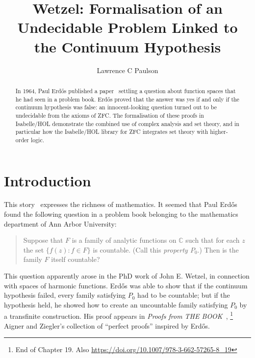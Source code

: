\documentclass[runningheads]{llncs}
\begin{document}
%
\title{Wetzel: Formalisation of an Undecidable Problem Linked to the Continuum Hypothesis}
%
\author{Lawrence C Paulson}
%
%
%
\maketitle              %
%
\begin{abstract}
In 1964, Paul Erd\H{o}s published a paper~\cite{erdos-interpolation} settling a question about function spaces that he had seen in a problem book.
Erd\H{o}s proved that the answer was yes if and only if the continuum hypothesis was false:
an innocent-looking question turned out to be undecidable from the axioms of ZFC\@.
The formalisation of these proofs in Isabelle/HOL demonstrate the combined use of complex analysis and set theory, and in particular how the Isabelle/HOL library for ZFC integrates set theory with higher-order logic.
\end{abstract}


\section{Introduction}

This story~\cite{garcia-wetzels-problem} expresses the richness of mathematics.
It seemed that Paul Erd\H{o}s found the following question in a problem book belonging to the mathematics department of Ann Arbor University:
\begin{quote}
Suppose that $F$ is a family of analytic functions on $\mathbb{C}$ such that for each $z$ the set $\{f (z): f\in F\}$ is countable. (Call this \emph{property $P_0$}.) Then is the family $F$ itself countable?
\end{quote}
This question apparently arose in the PhD work of John E. Wetzel, in connection with spaces of harmonic functions.
Erd\H{o}s was able to show that if the continuum hypothesis failed, every family satisfying $P_0$ had to be countable; but if the hypothesis held, he showed how to create an uncountable family satisfying $P_0$ by a transfinite construction.
His proof appears in \textit{Proofs from THE BOOK}~\cite{aigner-proofs},%
\footnote{End of Chapter 19. Also  \url{https://doi.org/10.1007/978-3-662-57265-8_19}}
Aigner and Ziegler's collection of ``perfect proofs'' inspired by  Erd\H{o}s.
\end{document}
